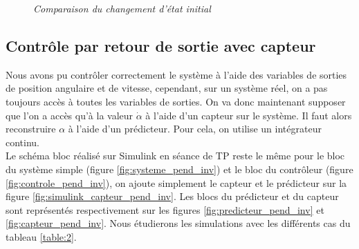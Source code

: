 \documentclass[11pt,french]{article} %
\begin{document}
\begin{figure}[H]%
    \centering
		\noindent{}%
		\caption{\textit{Comparaison du changement d'état initial}}%
		\label{fig:cas_5_6}%
\end{figure}
\vspace{0.5cm}




\subsection{Contrôle par retour de sortie avec capteur}

\quad Nous avons pu contrôler correctement le système à l'aide des variables de sorties de position angulaire et de vitesse, cependant, sur un système réel, on a pas toujours accès à toutes les variables de sorties. On va donc maintenant supposer que l'on a accès qu'à la valeur $\dot\alpha$ à l'aide d'un capteur sur le système. Il faut alors reconstruire $\alpha$ à l'aide d'un prédicteur. Pour cela, on utilise un intégrateur continu. \\

\quad Le schéma bloc réalisé sur Simulink en séance de TP reste le même pour le bloc du système simple (figure \ref{fig:systeme_pend_inv}) et le bloc du contrôleur (figure \ref{fig:controle_pend_inv}), on ajoute simplement le capteur et le prédicteur sur la figure \ref{fig:simulink_capteur_pend_inv}. Les blocs du prédicteur et du capteur sont représentés respectivement sur les figures \ref{fig:predicteur_pend_inv} et \ref{fig:capteur_pend_inv}. Nous étudierons les simulations avec les différents cas du tableau \ref{table:2}. \\
\end{document}
